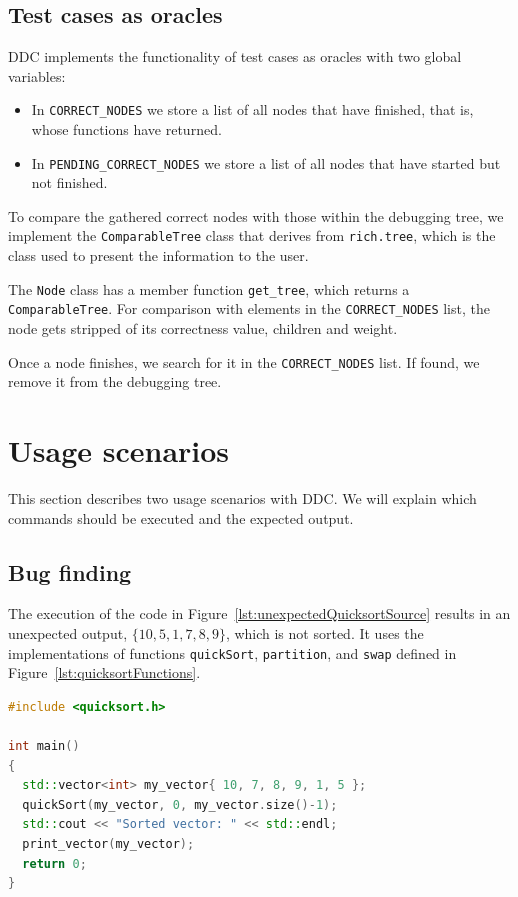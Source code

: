 \subsection{Test cases as oracles}
DDC implements the functionality of test cases as oracles with two global variables:

\begin{itemize}
    \item In \verb|CORRECT_NODES| we store a list of all nodes that have finished, that is, whose functions have returned.
    \item In \verb|PENDING_CORRECT_NODES| we store a list of all nodes that have started but not finished.
\end{itemize}

To compare the gathered correct nodes with those within the debugging tree, we implement the \verb|ComparableTree| class that derives from \verb|rich.tree|, which is the class used to present the information to the user.

The \verb|Node| class has a member function \verb|get_tree|, which returns a \verb|ComparableTree|.
For comparison with elements in the \verb|CORRECT_NODES| list, the node gets stripped of its correctness value, children and weight.

Once a node finishes, we search for it in the \verb|CORRECT_NODES| list. If found, we remove it from the debugging tree.

\section{Usage scenarios}
This section describes two usage scenarios with DDC.
We will explain which commands should be executed and the expected output.

\subsection{Bug finding}
The execution of the code in Figure~\ref{lst:unexpectedQuicksortSource} results in an unexpected output, \(\{10, 5, 1, 7, 8, 9\}\), which is not sorted.
It uses the implementations of functions \verb|quickSort|, \verb|partition|, and \verb|swap| defined in Figure~\ref{lst:quicksortFunctions}.
\begin{lstlisting}[language=C++, caption={Code that results in unexpected output}, frame=tb, label={lst:unexpectedQuicksortSource}]
#include <quicksort.h>

int main()
{
  std::vector<int> my_vector{ 10, 7, 8, 9, 1, 5 };
  quickSort(my_vector, 0, my_vector.size()-1);
  std::cout << "Sorted vector: " << std::endl;
  print_vector(my_vector);
  return 0;
}
\end{lstlisting}

